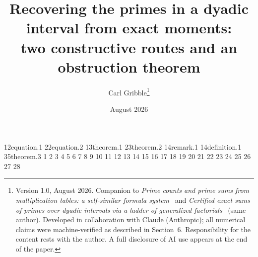 \documentclass[11pt]{article}
\title{Recovering the primes in a dyadic interval from exact moments:\\
two constructive routes and an obstruction theorem}
\author{Carl Gribble\thanks{Version 1.0, August 2026. Companion to \emph{Prime counts and prime
sums from multiplication tables: a self-similar formula system}~\cite{CompanionI} and \emph{Certified
exact sums of primes over dyadic intervals via a ladder of generalized factorials}~\cite{CompanionII}
(same author). Developed in collaboration with Claude (Anthropic); all numerical claims were
machine-verified as described in Section~6. Responsibility for the content rests with the author. A full disclosure of AI use appears at the end of the paper.}}
\date{August 2026}
\theoremstyle{remark}
\begin{document}
\makeatletter
\expandafter\gdef\csname r@eq:intch\endcsname {{1}{2}{}{equation.1}{}}
\expandafter\gdef\csname r@eq:wch\endcsname {{2}{2}{}{equation.2}{}}
\expandafter\gdef\csname r@thm:int\endcsname {{1}{3}{}{theorem.1}{}}
\expandafter\gdef\csname r@thm:prod\endcsname {{2}{3}{}{theorem.2}{}}
\expandafter\gdef\csname r@rem:prony\endcsname {{1}{4}{}{remark.1}{}}
\expandafter\gdef\csname r@def:scheme\endcsname {{1}{4}{}{definition.1}{}}
\expandafter\gdef\csname r@thm:lb\endcsname {{3}{5}{}{theorem.3}{}}
\expandafter\gdef\csname b@CompanionI\endcsname {1}
\expandafter\gdef\csname b@CompanionII\endcsname {2}
\expandafter\gdef\csname b@Linnik\endcsname {3}
\expandafter\gdef\csname b@McKenzie\endcsname {4}
\expandafter\gdef\csname b@Cheb\endcsname {5}
\expandafter\gdef\csname b@Macdonald\endcsname {6}
\expandafter\gdef\csname b@Prony\endcsname {7}
\expandafter\gdef\csname b@Mills\endcsname {8}
\expandafter\gdef\csname b@Willans\endcsname {9}
\expandafter\gdef\csname b@Erdos\endcsname {10}
\expandafter\gdef\csname b@Polymath\endcsname {11}
\expandafter\gdef\csname b@MSW\endcsname {12}
\expandafter\gdef\csname b@BOT\endcsname {13}
\expandafter\gdef\csname b@VandenEynden\endcsname {14}
\expandafter\gdef\csname b@Golomb\endcsname {15}
\expandafter\gdef\csname b@Fridman\endcsname {16}
\expandafter\gdef\csname b@JSWW\endcsname {17}
\expandafter\gdef\csname b@PrunescuShunia\endcsname {18}
\expandafter\gdef\csname b@Wilf\endcsname {19}
\expandafter\gdef\csname b@Dudley\endcsname {20}
\expandafter\gdef\csname b@CaldwellCheng\endcsname {21}
\expandafter\gdef\csname b@KolpakovRocke\endcsname {22}
\expandafter\gdef\csname b@Kontoyiannis\endcsname {23}
\expandafter\gdef\csname b@BrodnikMunro\endcsname {24}
\expandafter\gdef\csname b@ErdosRenyi\endcsname {25}
\expandafter\gdef\csname b@Moitra\endcsname {26}
\expandafter\gdef\csname b@BY\endcsname {27}
\expandafter\gdef\csname b@Code\endcsname {28}
\makeatother

\maketitle
\end{document}
